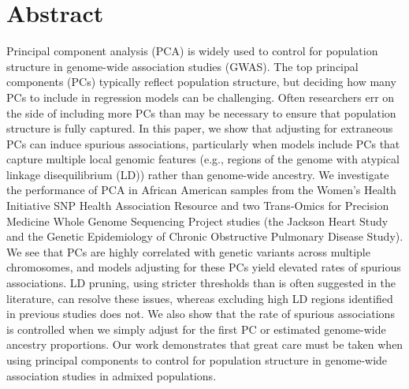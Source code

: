 \documentclass[12pt]{article}
\newcommand{\edit}[1]{{\color{red}{#1}}}
\begin{document}






\newpage
\section*{Abstract}



\noindent Principal component analysis (PCA) is widely used to control for population structure in genome-wide association studies (GWAS). 
The top principal components (PCs) typically reflect population structure, but deciding how many PCs to include in regression models can be challenging. 
Often researchers err on the side of including more PCs than may be necessary to ensure that population structure is fully captured. 
In this paper, we show that adjusting for extraneous PCs can induce spurious associations, particularly when models include PCs that capture multiple local genomic features (e.g., regions of the genome with atypical linkage disequilibrium (LD)) rather than genome-wide ancestry. 
We investigate the performance of PCA in African American samples from the Women's Health Initiative SNP Health Association Resource and two Trans-Omics for Precision Medicine Whole Genome Sequencing Project studies (the Jackson Heart Study and the Genetic Epidemiology of Chronic Obstructive Pulmonary Disease Study).
We see that PCs are highly correlated with genetic variants across multiple chromosomes, and models adjusting for these PCs yield elevated rates of spurious associations.
LD pruning, using stricter thresholds than is often suggested in the literature, can resolve these issues, whereas excluding high LD regions identified in previous studies does not. 
We also show that the rate of spurious associations is controlled when we simply adjust for the first PC or estimated genome-wide ancestry proportions. 
Our work demonstrates that great care must be taken when using principal components to control for population structure in genome-wide association studies in admixed populations.
\end{document}
